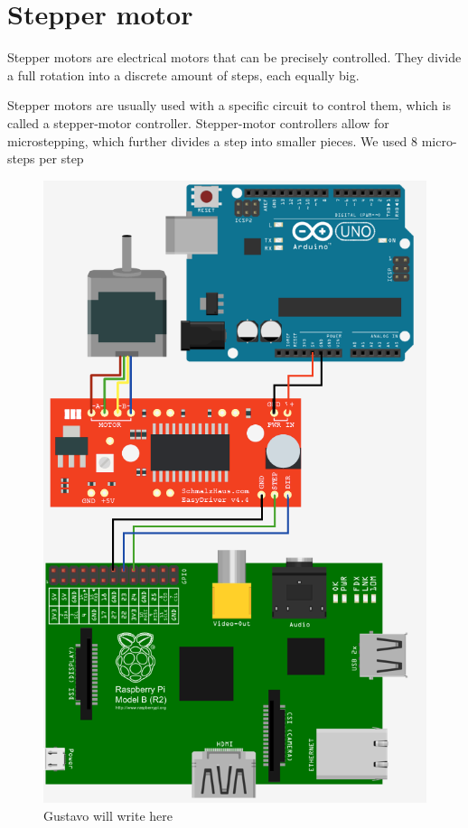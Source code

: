 \clearpage
\section{Stepper motor}
Stepper motors are electrical motors that can be precisely controlled. They divide a full rotation into a discrete amount of steps, each equally big.

Stepper motors are usually used with a specific circuit to control them, which is called a stepper-motor controller. Stepper-motor controllers allow for microstepping, which further divides a step into smaller pieces. We used 8 micro-steps per step

\begin{figure}[H]
	\centering
	\includegraphics[scale=.5]{images/steppermotor.png}
	\caption{Gustavo will write here}
	\label{fig:steppermotor}
\end{figure}

